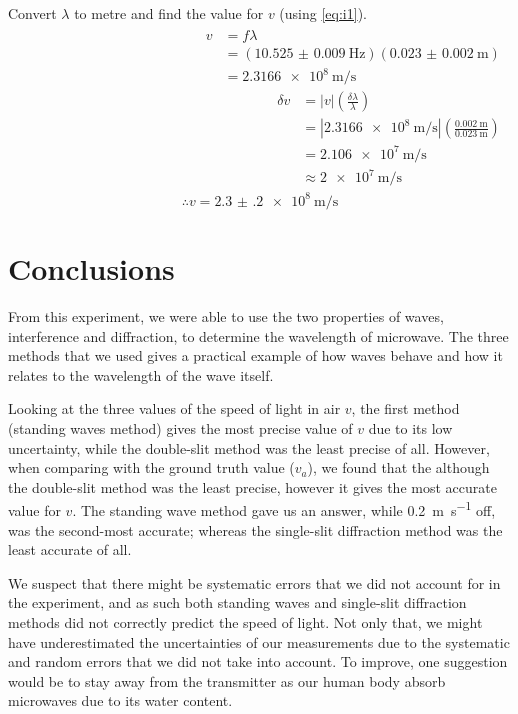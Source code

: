 \documentclass[letter,12pt]{article}
\newcommand{\tlambda}{\(\lambda\) }
\numberwithin{equation}{section}
\numberwithin{figure}{section}
\numberwithin{table}{section}
\begin{document}
Convert \tlambda to metre and find the value for \(v\) (using \eqref{eq:i1}).
\begin{align*}
  \begin{split}
  v &= f \lambda \\
  &= (\SI{10.525(9)}{\hertz})(\SI{0.023(2)}{\m}) \\
  &= \SI{2.3166e8}{\metre\per\second}
  \end{split}
  \begin{split}
    \delta v &= |v|\left( \frac{\delta \lambda}{\lambda} \right) \\
    &= |\SI{2.3166e8}{\metre\per\second}|\left( \frac{\SI{0.002}{\m}}{\SI{0.023}{\m}} \right) \\
    &= \SI{2.106e7}{\m\per\s} \\
    &\approx \SI{2e7}{\m\per\s}
  \end{split}
\end{align*}
\[\therefore v = \SI{2.3(2)e8}{\m\per\s}\]

\pagebreak
\section{Conclusions}
From this experiment, we were able to use the two properties of waves, interference and diffraction, to determine the wavelength of microwave. The three methods that we used gives a practical example of how waves behave and how it relates to the wavelength of the wave itself.

Looking at the three values of the speed of light in air \(v\), the first method (standing waves method) gives the most precise value of \(v\) due to its low uncertainty, while the double-slit method was the least precise of all. However, when comparing with the ground truth value (\(v_a\)), we found that the although the double-slit method was the least precise, however it gives the most accurate value for \(v\). The standing wave method gave us an answer, while \SI{0.2}{\m\per\s} off, was the second-most accurate; whereas the single-slit diffraction method was the least accurate of all.

We suspect that there might be systematic errors that we did not account for in the experiment, and as such both standing waves and single-slit diffraction methods did not correctly predict the speed of light. Not only that, we might have underestimated the uncertainties of our measurements due to the systematic and random errors that we did not take into account. To improve, one suggestion would be to stay away from the transmitter as our human body absorb microwaves due to its water content.  
\end{document}
